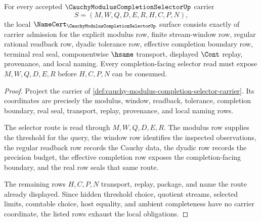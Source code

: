 \begin{theorem}\label{thm:cauchy-modulus-completion-selector-namecert-obligations}
For every accepted $\CauchyModulusCompletionSelectorUp$ carrier
$$
S=(M,W,Q,D,E,R,H,C,P,N),
$$
the local $\NameCert_{\CauchyModulusCompletionSelectorUp}$ surface consists
exactly of carrier admission for the explicit modulus row, finite stream-window
row, regular rational readback row, dyadic tolerance row, effective completion
boundary row, terminal real seal, componentwise $\hsame$ transport, displayed
$\Cont$ replay, provenance, and local naming. Every completion-facing selector
read must expose $M,W,Q,D,E,R$ before $H,C,P,N$ can be consumed.
\end{theorem}
\begin{proof}
Project the carrier of
\autoref{def:cauchy-modulus-completion-selector-carrier}. Its coordinates are
precisely the modulus, window, readback, tolerance, completion boundary, real
seal, transport, replay, provenance, and local naming rows.

The selector route is read through $M,W,Q,D,E,R$. The modulus row supplies the
threshold for the query, the window row identifies the inspected observations,
the regular readback row records the Cauchy data, the dyadic row records the
precision budget, the effective completion row exposes the completion-facing
boundary, and the real row seals that same route.

The remaining rows $H,C,P,N$ transport, replay, package, and name the route
already displayed. Since hidden threshold choice, quotient streams, selected
limits, countable choice, host equality, and ambient completeness have no
carrier coordinate, the listed rows exhaust the local obligations.
\end{proof}

